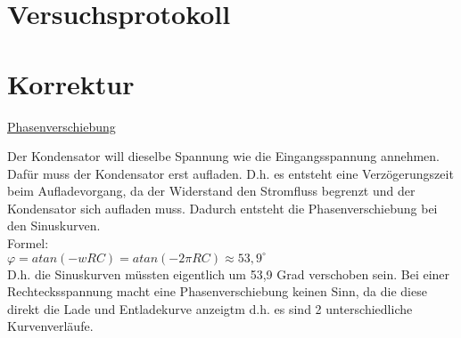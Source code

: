 \documentclass[paper=a4, fontsize=11pt]{scrartcl}
\numberwithin{equation}{section}
\numberwithin{figure}{section}
\numberwithin{table}{section}
\begin{document}

\newpage

\section{Versuchsprotokoll}


\newpage

\section{Korrektur}

\underline{Phasenverschiebung}

Der Kondensator will dieselbe Spannung wie die Eingangsspannung annehmen. Dafür muss der Kondensator erst aufladen. D.h. es entsteht eine Verzögerungszeit beim Aufladevorgang, da der Widerstand den Stromfluss begrenzt und der Kondensator sich aufladen muss. Dadurch entsteht die Phasenverschiebung bei den Sinuskurven. \\

Formel: \\ 
$\varphi = atan(-wRC) = atan(-2 \pi RC) \approx 53,9^{\circ}$ \\ 

D.h. die Sinuskurven müssten eigentlich um 53,9 Grad verschoben sein. 
Bei einer Rechtecksspannung macht eine Phasenverschiebung keinen Sinn, da die diese direkt die Lade und Entladekurve anzeigtm d.h. es sind 2 unterschiedliche Kurvenverläufe.
\end{document}
